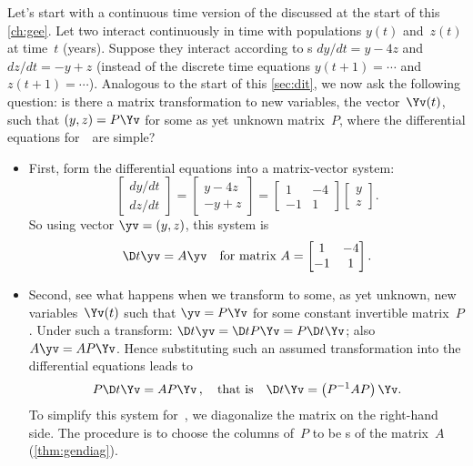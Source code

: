 Let's start with a continuous time version of the  discussed at the start of this \autoref{ch:gee}.
Let two  interact continuously in time with populations \(y(t)\) and~\(z(t)\) at time~\(t\) (years).
Suppose they interact according to s \(dy/dt=y-4z\) and \(dz/dt=-y+z\) (instead of the discrete time equations \(y(t+1)=\cdots\) and \(z(t+1)=\cdots\)).
Analogous to the start of this \autoref{sec:dit}, we now ask the following question: is there a matrix transformation to new variables, the vector~\(\Yv(t)\), such that \((y,z)=P\Yv\) for some as yet unknown matrix~\(P\), where the differential equations for~\Yv\ are simple?
\begin{itemize}
\item First, form the differential equations into a matrix-vector system:
\begin{equation*}
\begin{bmatrix} dy/dt\\dz/dt \end{bmatrix}
=\begin{bmatrix} y-4z
\\ -y+z \end{bmatrix}
=\begin{bmatrix} 1&-4\\-1& 1 \end{bmatrix}\begin{bmatrix} y\\z \end{bmatrix}.
\end{equation*}
So using vector \(\yv=(y,z)\), this system is
\begin{equation*}
\D t\yv=A\yv
\quad\text{for matrix }A=\begin{bmatrix} 1&-4\\-1& 1 \end{bmatrix}.
\end{equation*}

\item Second, see what happens when we transform to some, as yet unknown, new variables~\(\Yv(t)\) such that \(\yv=P\Yv\) for some constant invertible matrix~\(P\).
Under such a transform: \(\D t\yv=\D t{}P\Yv=P\D t\Yv\); also \(A\yv=AP\Yv\).
Hence substituting such an assumed transformation into the differential equations leads to
\begin{equation*}
P\D t\Yv=AP\Yv\,, 
\quad\text{that is}\quad
\D t\Yv=\left(P^{-1}AP\right)\Yv.
\end{equation*}
To simplify this system for~\Yv, we diagonalize the matrix on the right-hand side.
The procedure is to choose the columns of~\(P\) to be s of the matrix~\(A\) (\autoref{thm:gendiag}).


\end{itemize}
